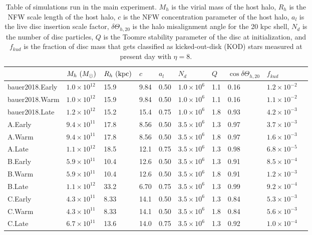 \begin{table}
\centering
\caption{Table of simulations run in the main experiment. $M_h$ is the
  virial mass of the host halo, $R_h$ is the NFW scale length of the
  host halo, $c$ is the NFW concentration parameter of the host halo,
  $a_l$ is the live disc insertion scale factor, $\delta
  \Theta_{h,20}$ is the halo misalignment angle for the 20 kpc shell,
  $N_d$ is the number of disc particles, $Q$ is the Toomre stability
  parameter of the disc at initialization, and $f_{kud}$ is the
  fraction of disc mass that gets classified as kicked-out-disk (KOD)
  stars measured at present day with $\eta=8$.} \label{tab:sims_iii}
\begin{tabular}{l l l l l l l l l l}
\hline
       & $M_h\,\,(M_\odot)$ & $R_h\,\,(\text{kpc})$ & $c$ & $a_l$ &  $N_d$ & $Q$ & $\cos\delta \Theta_{h,20}$ & $f_{kud}$\\
\hline
bauer2018.Early   & $1.0 \times 10^{12}$ & 15.9 &  9.84 &   0.50 & $1.0 \times 10^6$ & 1.1 & 0.16 & $1.2 \times 10^{-2}$\\
bauer2018.Warm    & $1.0 \times 10^{12}$ & 15.9 &  9.84 &   0.50 & $1.0 \times 10^6$ & 1.1 & 0.16 & $1.1 \times 10^{-2}$\\
bauer2018.Late    & $1.2 \times 10^{12}$ & 15.2 &  15.4 &   0.75 & $1.0 \times 10^6$ & 1.8 & 0.93 &$4.2 \times 10^{-3}$\\
A.Early           & $9.4 \times 10^{11}$ & 17.8 &  8.56 &   0.50 & $3.5 \times 10^6$ & 1.3 & 0.97 &$3.7 \times 10^{-3}$\\
A.Warm            & $9.4 \times 10^{11}$ & 17.8 &  8.56 &   0.50 & $3.5 \times 10^6$ & 1.8 & 0.97 & $1.6 \times 10^{-3}$\\
A.Late            & $1.1 \times 10^{12}$ & 18.5 &  12.1 &   0.75 & $3.5 \times 10^6$ & 1.3 & 0.98 & $6.8 \times 10^{-5}$\\
B.Early           & $5.9 \times 10^{11}$ & 10.4 &  12.6 &   0.50 & $3.5 \times 10^6$ & 1.3 & 0.91 & $8.5 \times 10^{-4}$\\
B.Warm            & $5.9 \times 10^{11}$ & 10.4 &  12.6 &   0.50 & $3.5 \times 10^6$ & 1.8 & 0.91 & $1.2 \times 10^{-3}$\\
B.Late            & $1.1 \times 10^{12}$ & 33.2 &  6.70 &   0.75 & $3.5 \times 10^6$ & 1.3 & 0.99 & $9.2 \times 10^{-4}$\\
C.Early           & $4.3 \times 10^{11}$ & 8.33 &  14.1 &   0.50 & $3.5 \times 10^6$ & 1.3 & 0.84 & $5.3 \times 10^{-3}$\\
C.Warm            & $4.3 \times 10^{11}$ & 8.33 &  14.1 &   0.50 & $3.5 \times 10^6$ & 1.8 & 0.84 & $5.6 \times 10^{-3}$\\
C.Late            & $6.7 \times 10^{11}$ & 13.6 &  14.0 &   0.75 & $3.5 \times 10^6$ & 1.3 & 0.92 & $1.0 \times 10^{-4}$\\
\hline
\end{tabular} 

\end{table}

